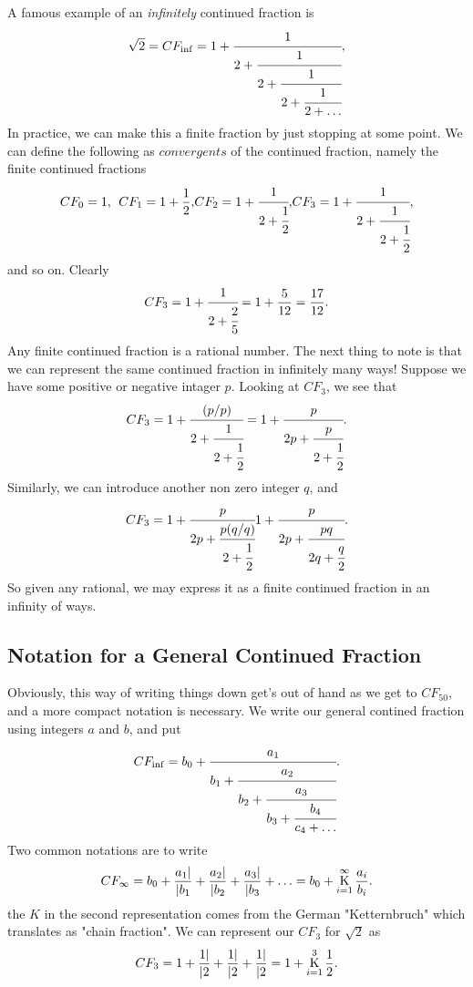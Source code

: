 \documentclass[12pt]{article}
\numberwithin{equation}{section}
\numberwithin{figure}{section}
\numberwithin{figure}{section}
\numberwithin{equation}{section}
\newcommand{\K}{\operatornamewithlimits{K}}
\begin{document}
A famous  example of an {\it infinitely} continued fraction is 
\begin{equation}
\sqrt{2}=CF_{\inf}=1+\cfrac{1}{2+\cfrac{1}{2+\cfrac{1}{2+\cfrac{1}{2+\ldots}}}},
\end{equation}
In practice, we can make this a finite fraction by just stopping at some point.
We can define the following as $convergents$ of the continued fraction, namely
the finite continued fractions
\begin{equation}
CF_{0}=1, \> \> CF_{1}=1+\frac{1}{2},
$$   $$
CF_{2}=1+\cfrac{1}{2+\cfrac{1}{2}},
$$   $$
CF_{3}=1+\cfrac{1}{2+\cfrac{1}{2+\cfrac{1}{2}}},
\label{Sea3}
\end{equation}
and so on.  Clearly
\begin{equation}
CF_{3}=1+\cfrac{1}{2+\cfrac{2}{5} }=1+\frac{5}{12}=\frac{17}{12}.
\end{equation}
Any finite continued fraction is a rational number. The next thing to note is that we can represent
the same continued fraction in infinitely many ways! Suppose we have some positive or negative 
intager  $p$. Looking at $CF_3$, we see that
\begin{equation}
CF_{3}=1+\cfrac{(p/p)}{2+\cfrac{1}{2+\cfrac{1}{2}}}=1+\cfrac{p}{2p+\cfrac{p}{2+\cfrac{1}{2}}}.
\end{equation}
Similarly, we can introduce another non zero integer $q$, and
\begin{equation}
CF_{3}=1+\cfrac{p}{2p+\cfrac{p (q/q)}{2+\cfrac{1}{2}}}1+\cfrac{p}{2p+\cfrac{p q}{2q+\cfrac{q}{2}}}.
\end{equation}
So given any rational, we may express it as a finite continued fraction in an infinity of ways.

\subsection{Notation for a General Continued Fraction}

Obviously, this way of writing things down get's out of hand as we get to $CF_{50}$, and a more compact
notation is necessary. We write our general contined fraction using integers $a$ and $b$, and put
\begin{equation}
CF_{\inf}=b_0+\cfrac{a_1}{b_1+\cfrac{a_2}{b_2+\cfrac{a_3}{b_3+\cfrac{b_4}{c_4+\ldots}}}}.
\end{equation}
Two common notations are to write
\begin{equation}
CF_{\infty}=b_0 +\frac{a_1 \vert}{\vert b_1}+\frac{a_2 \vert}{\vert b_2}
+\frac{a_3 \vert}{\vert b_3}+\ldots
=b_0+\K_{i=1}^\infty \frac{a_i}{b_i}.
\end{equation}
the $K$ in the second representation comes from the German "Ketternbruch" which translates as
"chain fraction". We can represent our $CF_3$ for $\sqrt{2}$ as
\begin{equation}
CF_{3}=1 +\frac{1 \vert}{\vert 2}+\frac{1 \vert}{\vert 2}
+\frac{1 \vert}{\vert 2}
=1+\K_{i=1}^3 \frac{1}{2}.
\end{equation}
\end{document}
